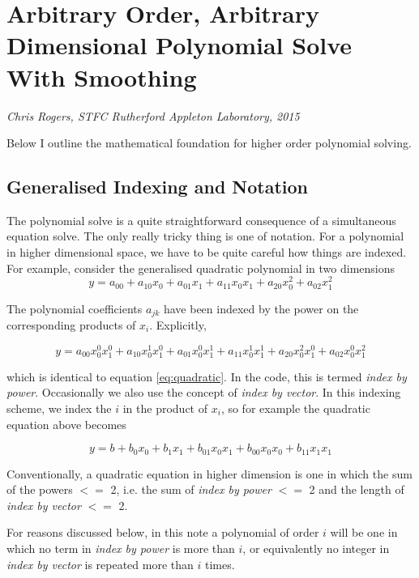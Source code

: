 \documentclass{article}
\begin{document}
\section{Arbitrary Order, Arbitrary Dimensional Polynomial Solve With Smoothing}

\emph{Chris Rogers, STFC Rutherford Appleton Laboratory, 2015}

Below I outline the mathematical foundation for higher order polynomial solving.

\subsection{Generalised Indexing and Notation}

The polynomial solve is a quite straightforward consequence of a simultaneous
equation solve. The only really tricky thing is one of notation. For a 
polynomial in higher dimensional space, we have to be quite careful how things
are indexed. For example, consider the generalised quadratic polynomial in two
dimensions
\begin{equation}
\label{eq:quadratic}
y = a_{00} + a_{10} x_0 + a_{01} x_1 + a_{11} x_0 x_1 + a_{20} x_0^2 + a_{02} x_1^2
\end{equation}

The polynomial coefficients $a_{jk}$ have been indexed by the power on the
corresponding products of $x_i$. Explicitly,

\begin{equation}
y = a_{00} x_0^0 x_1^0 + a_{10} x_0^1 x_1^0 + a_{01} x_0^0 x_1^1 + a_{11} x_0^1 x_1^1 + a_{20} x_0^2 x_1^0 + a_{02} x_0^0 x_1^2
\end{equation}

which is identical to equation \ref{eq:quadratic}. In the code, this is termed
\emph{index by power}. Occasionally we also use the concept of \emph{index by 
vector}. In this indexing scheme, we index the $i$ in the product of $x_i$, so
for example the quadratic equation above becomes

\begin{equation}
y = b+ b_{0} x_0 + b_{1} x_1 + b_{01} x_0 x_1 + b_{00} x_0 x_0 + b_{11} x_1 x_1
\end{equation}

Conventionally, a quadratic equation in higher dimension is one in which the sum
of the powers $<=$ 2, i.e. the sum of \emph{index by power} $<=$ 2 and the
length of \emph{index by vector} $<=$ 2.

For reasons discussed below, in this note a polynomial of order $i$ will be one
in which no term in \emph{index by power} is more than $i$, or equivalently no
integer in \emph{index by vector} is repeated more than $i$ times.
\end{document}
